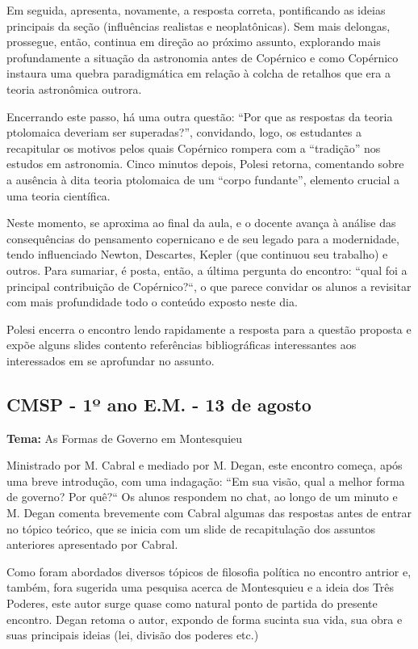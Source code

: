 \documentclass[12pt,a4paper]{article}
\begin{document}
	Em seguida, apresenta, novamente, a resposta correta, pontificando as 
	ideias principais da seção (influências realistas e neoplatônicas). 
	Sem mais delongas, prossegue, então, continua em direção ao próximo 
	assunto, explorando mais profundamente a situação da astronomia 
	antes de Copérnico e como Copérnico instaura uma quebra paradigmática 
	em relação à colcha de retalhos que era a teoria astronômica outrora. 

	Encerrando este passo, há uma outra questão: “Por que as respostas da 
	teoria ptolomaica deveriam ser superadas?”, convidando, logo, os 
	estudantes a recapitular os motivos pelos quais Copérnico rompera com 
	a “tradição” nos estudos em astronomia. Cinco minutos depois, Polesi 
	retorna, comentando sobre a ausência à dita teoria ptolomaica de um 
	“corpo fundante”, elemento crucial a uma teoria científica. 

	Neste momento, se aproxima ao final da aula, e o docente avança à 
	análise das consequências do pensamento copernicano e de seu legado 
	para a modernidade, tendo influenciado Newton, Descartes, Kepler 
	(que continuou seu trabalho) e outros. Para sumariar, é posta, então, 
	a última pergunta do encontro: “qual foi a principal contribuição de 
	Copérnico?“, o que parece convidar os alunos a revisitar com mais 
	profundidade todo o conteúdo exposto neste dia. 

	Polesi encerra o encontro lendo rapidamente a resposta para a questão 
	proposta e expõe alguns slides contento referências bibliográficas 
	interessantes aos interessados em se aprofundar no assunto. 

	\subsection{CMSP - 1º ano E.M. - 13 de agosto}

	\textbf{Tema:} As Formas de Governo em Montesquieu

	Ministrado por M. Cabral e mediado por M. Degan, este encontro começa, 
	após uma breve introdução, com uma indagação: “Em sua visão, qual a 
	melhor forma de governo? Por quê?“ Os alunos respondem no chat, 
	ao longo de um minuto e M. Degan comenta brevemente com Cabral algumas 
	das respostas antes de entrar no tópico teórico, que se inicia com 
	um slide de recapitulação dos assuntos anteriores apresentado por 
	Cabral. 

	Como foram abordados diversos tópicos de filosofia política no 
	encontro antrior e, também, fora sugerida uma pesquisa acerca de 
	Montesquieu e a ideia dos Três Poderes, este autor surge quase 
	como natural ponto de partida do presente encontro. Degan retoma 
	o autor, expondo de forma sucinta sua vida, sua obra e suas 
	principais ideias (lei, divisão dos poderes etc.) 
\end{document}
